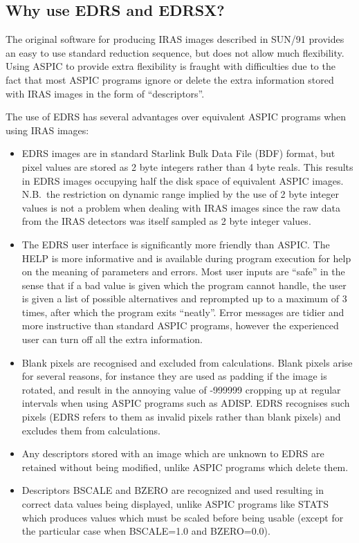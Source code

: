 \subsection {Why use EDRS and EDRSX?}
The original software for producing IRAS images described in SUN/91 provides
an easy to use standard reduction sequence, but does not allow much flexibility.
Using ASPIC to provide extra flexibility is fraught with difficulties due to the
fact that most ASPIC programs ignore or delete the extra information stored with
IRAS images in the form of ``descriptors''.

The use of EDRS has several advantages over equivalent ASPIC programs when
using IRAS images:
\begin{itemize}
\item EDRS images are in standard Starlink Bulk Data File (BDF) format, but
pixel values are stored as 2 byte integers rather than 4 byte reals.
This results in EDRS images occupying half the disk space of equivalent ASPIC
images.
N.B.\ the restriction on dynamic range implied by the use of 2 byte integer
values is not a problem when dealing with IRAS images since the raw data from
the IRAS detectors was itself sampled as 2 byte integer values.
\item The EDRS user interface is significantly more friendly than ASPIC.
The HELP is more informative and is available during program execution
for help on the meaning of parameters and errors.
Most user inputs are ``safe'' in the sense that if a bad value is given which
the program cannot handle, the user is given a list of possible alternatives
and reprompted up to a maximum of 3 times, after which the program exits
``neatly''.
Error messages are tidier and more instructive than standard ASPIC programs,
however the experienced user can turn off all the extra information.
\item Blank pixels are recognised and excluded from calculations.
Blank pixels arise for several reasons, for instance they are used as padding
if the image is rotated, and result in the annoying value of -999999
cropping up at regular intervals when using ASPIC programs such as ADISP.
EDRS recognises such pixels (EDRS refers to them as invalid pixels rather than
blank pixels) and excludes them from calculations.
\item Any descriptors stored with an image which are unknown to EDRS are
retained without being modified, unlike ASPIC programs which delete them.
\item Descriptors BSCALE and BZERO are recognized and used resulting in correct
data values being displayed, unlike ASPIC programs like STATS which produces
values which must be scaled before being usable (except for the particular case
when BSCALE=1.0 and BZERO=0.0).
\end{itemize}
